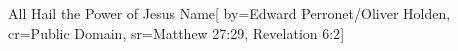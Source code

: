 {All Hail the Power of Jesus Name}[
    by={Edward Perronet/Oliver Holden},
    cr={Public Domain},
    sr={Matthew 27:29, Revelation 6:2}]
